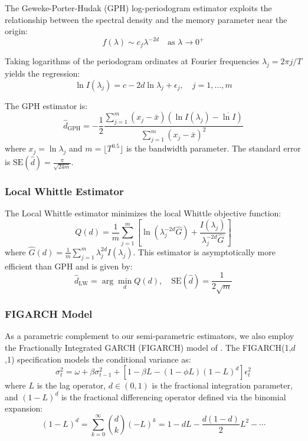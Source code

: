 \documentclass[12pt,a4paper]{article}
\begin{document}
The Geweke-Porter-Hudak (GPH) log-periodogram estimator \citep{geweke1983estimation} exploits the relationship between the spectral density and the memory parameter near the origin:
\begin{equation}
    f(\lambda) \sim c_f \lambda^{-2d} \quad \text{as } \lambda \to 0^+
\end{equation}

Taking logarithms of the periodogram ordinates at Fourier frequencies $\lambda_j = 2\pi j/T$ yields the regression:
\begin{equation}
    \ln I(\lambda_j) = c - 2d \ln \lambda_j + \epsilon_j, \quad j = 1, \ldots, m
\end{equation}

The GPH estimator is:
\begin{equation}
    \hat{d}_{\text{GPH}} = -\frac{1}{2} \frac{\sum_{j=1}^m (x_j - \bar{x})(\ln I(\lambda_j) - \overline{\ln I})}{\sum_{j=1}^m (x_j - \bar{x})^2}
\end{equation}
where $x_j = \ln \lambda_j$ and $m = \lfloor T^{0.5} \rfloor$ is the bandwidth parameter. The standard error is $\text{SE}(\hat{d}) = \frac{\pi}{\sqrt{24m}}$.

\subsubsection{Local Whittle Estimator}

The Local Whittle estimator \citep{robinson1995gaussian} minimizes the local Whittle objective function:
\begin{equation}
    Q(d) = \frac{1}{m}\sum_{j=1}^m \left[\ln(\lambda_j^{-2d} \hat{G}) + \frac{I(\lambda_j)}{\lambda_j^{-2d}\hat{G}}\right]
\end{equation}
where $\hat{G}(d) = \frac{1}{m}\sum_{j=1}^m \lambda_j^{2d} I(\lambda_j)$. This estimator is asymptotically more efficient than GPH and is given by:
\begin{equation}
    \hat{d}_{\text{LW}} = \arg\min_d Q(d), \quad \text{SE}(\hat{d}) = \frac{1}{2\sqrt{m}}
\end{equation}

\subsubsection{FIGARCH Model}

As a parametric complement to our semi-parametric estimators, we also employ the Fractionally Integrated GARCH (FIGARCH) model of \citet{baillie1996figarch}. The FIGARCH(1,$d$,1) specification models the conditional variance as:
\begin{equation}
    \sigma_t^2 = \omega + \beta \sigma_{t-1}^2 + \left[1 - \beta L - (1-\phi L)(1-L)^d\right] \epsilon_t^2
\end{equation}
where $L$ is the lag operator, $d \in (0, 1)$ is the fractional integration parameter, and $(1-L)^d$ is the fractional differencing operator defined via the binomial expansion:
\begin{equation}
    (1-L)^d = \sum_{k=0}^{\infty} \binom{d}{k} (-L)^k = 1 - dL - \frac{d(1-d)}{2}L^2 - \cdots
\end{equation}
\end{document}
